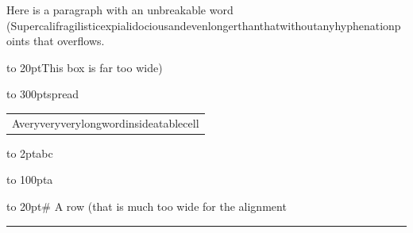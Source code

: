 \documentclass{article}
\begin{document}
\hsize=200pt
Here is a paragraph with an unbreakable word (Supercalifragilisticexpialidociousandevenlongerthanthatwithoutanyhyphenationpoints that overflows.

\hbox to 20pt{This box is far too wide)}

\hbox to 300pt{spread}

\begin{tabular}{p{1cm}}
Averyveryverylongwordinsideatablecell \\
\end{tabular}

\vbox to 2pt{\hbox{a}\hbox{b}\hbox{c}}

\vbox to 100pt{\hbox{a}}

\halign to 20pt{#\tabskip=0pt\cr
A row (that is much too wide for the alignment\cr
}

\noindent\rule{1pt}{1000pt}
\end{document}
